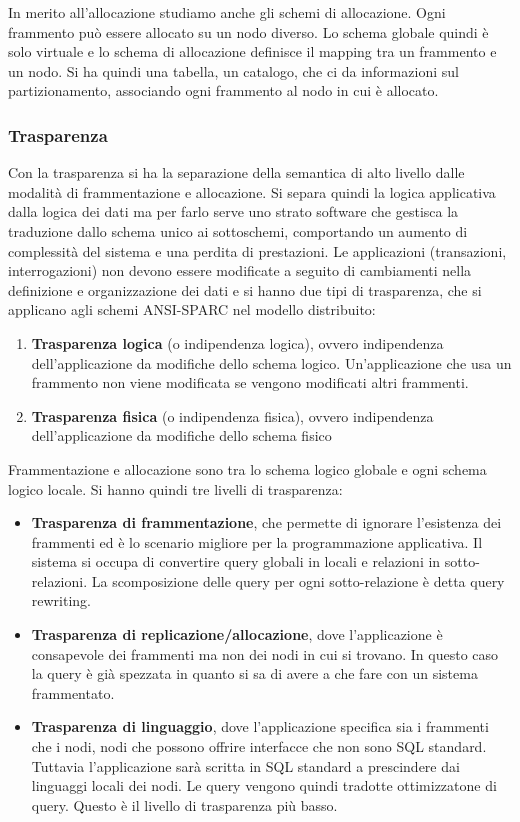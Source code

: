 In merito all'allocazione studiamo anche gli schemi di allocazione. Ogni
frammento può essere allocato su un nodo diverso. Lo schema globale quindi
è solo virtuale e lo schema di allocazione definisce il mapping tra un frammento
e un nodo. Si ha quindi una tabella, un catalogo, che ci da informazioni sul
partizionamento, associando ogni frammento al nodo in cui è allocato.
\subsubsection{Trasparenza}
Con la trasparenza si ha la separazione della semantica di alto livello dalle
modalità di frammentazione e allocazione. Si separa quindi la logica applicativa
dalla logica dei dati ma per farlo serve uno strato software che gestisca la
traduzione dallo schema unico ai sottoschemi, comportando un aumento di
complessità del sistema e una perdita di prestazioni.
Le applicazioni (transazioni, interrogazioni) non devono essere modificate a
seguito di cambiamenti nella definizione e organizzazione dei dati e si hanno
due tipi di trasparenza, che si applicano agli schemi ANSI-SPARC nel
modello distribuito:
\begin{enumerate}
    \item \textbf{Trasparenza logica} (o indipendenza logica), ovvero
          indipendenza dell'applicazione da modifiche dello schema logico.
          Un'applicazione che usa un frammento non viene modificata se vengono
          modificati altri frammenti.
    \item \textbf{Trasparenza fisica} (o indipendenza fisica), ovvero
          indipendenza dell'applicazione da modifiche dello schema fisico
\end{enumerate}

Frammentazione e allocazione sono tra lo schema logico globale e ogni schema
logico locale. Si hanno quindi tre livelli di trasparenza:
\begin{itemize}
    \item \textbf{Trasparenza di frammentazione}, che permette di ignorare
          l'esistenza dei frammenti ed è lo scenario migliore per la
          programmazione applicativa. Il sistema si occupa di convertire query
          globali in locali e relazioni in sotto-relazioni. La scomposizione
          delle query per ogni sotto-relazione è detta query rewriting.
    \item \textbf{Trasparenza di replicazione/allocazione}, dove l'applicazione
          è consapevole dei frammenti ma non dei nodi in cui si trovano. In questo
          caso la query è già spezzata in quanto si sa di avere a che fare con un
          sistema frammentato.
    \item \textbf{Trasparenza di linguaggio}, dove l'applicazione specifica
          sia i frammenti che i nodi, nodi che possono offrire interfacce che
          non sono SQL standard. Tuttavia l'applicazione sarà scritta in SQL
          standard a prescindere dai linguaggi locali dei nodi. Le query
          vengono quindi tradotte ottimizzatone di query. Questo è il livello
          di trasparenza più basso.
\end{itemize}

